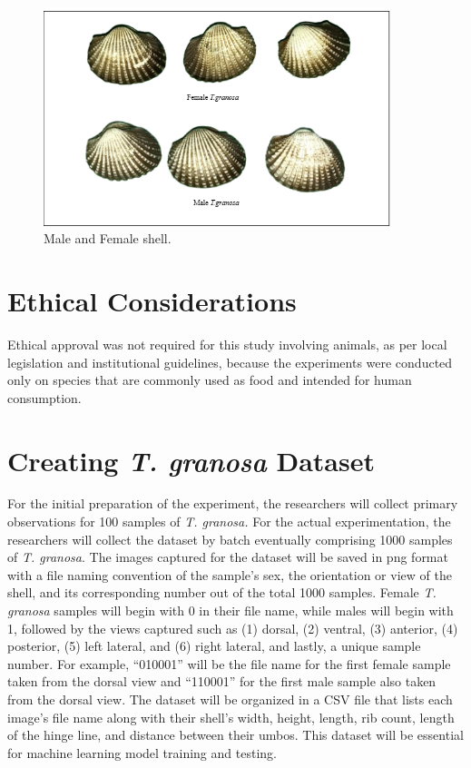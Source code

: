 \begin{figure}[!htbp]
	\centering
	\includegraphics[width=0.9\textwidth]{figures/male-female T.granosa.png}
	\caption{Male and Female \Tegillarcagranosa shell.}
\end{figure}

\section{Ethical Considerations}
\label{sec:ethical}

Ethical approval was not required for this study involving animals, as per local legislation and institutional guidelines, because the experiments were conducted only on species that are commonly used as food and intended for human consumption. 


\section{Creating \textit{T. granosa} Dataset}
\label{sec:dataset}

For the initial preparation of the experiment, the researchers will collect primary observations for 100 samples of \textit{T. granosa.} For the actual experimentation, the researchers will collect the dataset by batch eventually comprising 1000 samples of \textit{T. granosa}. The images captured for the dataset will be saved in png format with a file naming convention of the sample’s sex, the orientation or view of the shell, and its corresponding number out of the total 1000 samples. Female \textit{T. granosa} samples will begin with 0 in their file name, while males will begin with 1, followed by the views captured such as (1) dorsal, (2) ventral, (3) anterior, (4) posterior, (5) left lateral, and (6) right lateral, and lastly, a unique sample number. For example, “010001” will be the file name for the first female sample taken from the dorsal view and “110001” for the first male sample also taken from the dorsal view. The dataset will be organized in a CSV file that lists each image’s file name along with their shell’s width, height, length, rib count, length of the hinge line, and distance between their umbos. This dataset will be essential for machine learning model training and testing. 

